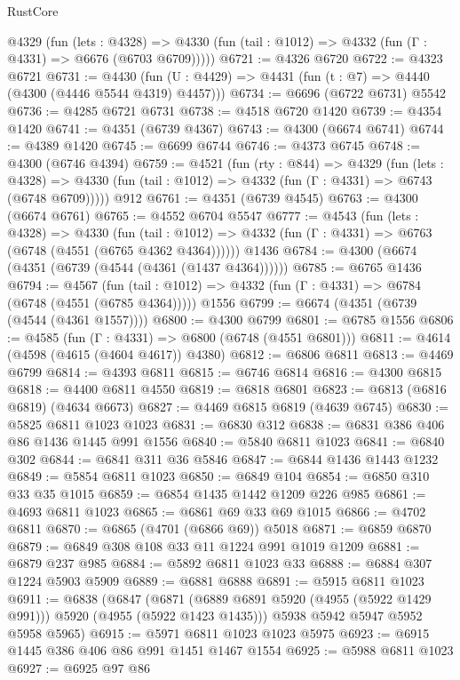 \begin{lexlean}{RustCore}
\begin{coremodule}
    @4329
      (fun (lets : @4328) =>
      @4330 (fun (tail : @1012) => @4332 (fun (Γ : @4331) => @6676 (@6703 @6709)))))
@6721 := @4326 @6720
@6722 := @4323 @6721
@6731 := @4430 (fun (U : @4429) => @4431 (fun (t : @7) => @4440 (@4300 (@4446 @5544 @4319) @4457)))
@6734 := @6696 (@6722 @6731) @5542
@6736 := @4285 @6721 @6731
@6738 := @4518 @6720 @1420
@6739 := @4354 @1420
@6741 := @4351 (@6739 @4367)
@6743 := @4300 (@6674 @6741)
@6744 := @4389 @1420
@6745 := @6699 @6744
@6746 := @4373 @6745
@6748 := @4300 (@6746 @4394)
@6759 := @4521
    (fun (rty : @844) =>
    @4329
      (fun (lets : @4328) =>
      @4330 (fun (tail : @1012) => @4332 (fun (Γ : @4331) => @6743 (@6748 @6709)))))
    @912
@6761 := @4351 (@6739 @4545)
@6763 := @4300 (@6674 @6761)
@6765 := @4552 @6704 @5547
@6777 := @4543
    (fun (lets : @4328) =>
    @4330
      (fun (tail : @1012) => @4332 (fun (Γ : @4331) => @6763 (@6748 (@4551 (@6765 @4362 @4364))))))
    @1436
@6784 := @4300 (@6674 (@4351 (@6739 (@4544 (@4361 (@1437 @4364))))))
@6785 := @6765 @1436
@6794 := @4567
    (fun (tail : @1012) => @4332 (fun (Γ : @4331) => @6784 (@6748 (@4551 (@6785 @4364)))))
    @1556
@6799 := @6674 (@4351 (@6739 (@4544 (@4361 @1557))))
@6800 := @4300 @6799
@6801 := @6785 @1556
@6806 := @4585 (fun (Γ : @4331) => @6800 (@6748 (@4551 @6801)))
@6811 := @4614 (@4598 (@4615 (@4604 @4617)) @4380)
@6812 := @6806 @6811
@6813 := @4469 @6799
@6814 := @4393 @6811
@6815 := @6746 @6814
@6816 := @4300 @6815
@6818 := @4400 @6811 @4550
@6819 := @6818 @6801
@6823 := @6813 (@6816 @6819) (@4634 @6673)
@6827 := @4469 @6815 @6819 (@4639 @6745)
@6830 := @5825 @6811 @1023 @1023
@6831 := @6830 @312
@6838 := @6831 @386 @406 @86 @1436 @1445 @991 @1556
@6840 := @5840 @6811 @1023
@6841 := @6840 @302
@6844 := @6841 @311 @36 @5846
@6847 := @6844 @1436 @1443 @1232
@6849 := @5854 @6811 @1023
@6850 := @6849 @104
@6854 := @6850 @310 @33 @35 @1015
@6859 := @6854 @1435 @1442 @1209 @226 @985
@6861 := @4693 @6811 @1023
@6865 := @6861 @69 @33 @69 @1015
@6866 := @4702 @6811
@6870 := @6865 (@4701 (@6866 @69)) @5018
@6871 := @6859 @6870
@6879 := @6849 @308 @108 @33 @11 @1224 @991 @1019 @1209
@6881 := @6879 @237 @985
@6884 := @5892 @6811 @1023 @33
@6888 := @6884 @307 @1224 @5903 @5909
@6889 := @6881 @6888
@6891 := @5915 @6811 @1023
@6911 := @6838
    (@6847
      (@6871 (@6889 @6891 @5920 (@4955 (@5922 @1429 @991))) @5920 (@4955 (@5922 @1423 @1435)))
      @5938
      @5942
      @5947
      @5952
      @5958
      @5965)
@6915 := @5971 @6811 @1023 @1023 @5975
@6923 := @6915 @1445 @386 @406 @86 @991 @1451 @1467 @1554
@6925 := @5988 @6811 @1023
@6927 := @6925 @97 @86

\end{coremodule}
\end{lexlean}
